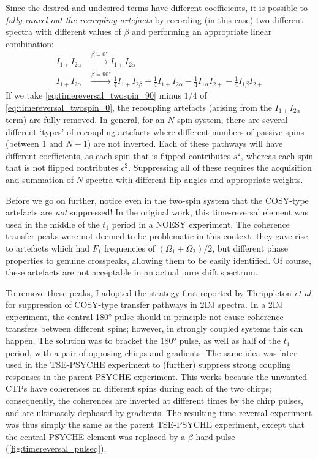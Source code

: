 Since the desired and undesired terms have different coefficients, it is possible to \textit{fully cancel out the recoupling artefacts} by recording (in this case) two different spectra with different values of $\beta$ and performing an appropriate linear combination:
\begin{align}
    I_{1+}I_{2\alpha} &\xrightarrow{\beta = \ang{0}} I_{1+}I_{2\alpha} \label{eq:timereversal_twospin_0} \\
    I_{1+}I_{2\alpha} &\xrightarrow{\beta = \ang{90}} \frac{1}{4}I_{1+}I_{2\beta} + \frac{1}{4}I_{1+}I_{2\alpha} - \frac{1}{4}I_{1\alpha}I_{2+} + \frac{1}{4}I_{1\beta}I_{2+} \label{eq:timereversal_twospin_90}
\end{align}
If we take \cref{eq:timereversal_twospin_90} minus $1/4$ of \cref{eq:timereversal_twospin_0}, the recoupling artefacts (arising from the $I_{1+}I_{2\alpha}$ term) are fully removed.
In general, for an $N$-spin system, there are several different `types' of recoupling artefacts where different numbers of passive spins (between 1 and $N - 1$) are not inverted.
Each of these pathways will have different coefficients, as each spin that is flipped contributes $s^2$, whereas each spin that is not flipped contributes $c^2$.
Suppressing all of these requires the acquisition and summation of $N$ spectra with different flip angles and appropriate weights.

Before we go on further, notice even in the two-spin system that the COSY-type artefacts are \textit{not} suppressed!
In the original work\autocite{Sorensen1985JACS}, this time-reversal element was used in the middle of the $t_1$ period in a NOESY experiment.
The coherence transfer peaks were not deemed to be problematic in this context: they gave rise to artefacts which had $F_1$ frequencies of $(\Omega_1 + \Omega_2)/2$, but different phase properties to genuine crosspeaks, allowing them to be easily identified.
Of course, these artefacts are not acceptable in an actual pure shift spectrum.

To remove these peaks, I adopted the strategy first reported by Thrippleton \textit{et al.} for suppression of COSY-type transfer pathways in 2DJ spectra.\autocite{Thrippleton2005JMR}
In a 2DJ experiment, the central \ang{180} pulse should in principle not cause coherence transfers between different spins; however, in strongly coupled systems this can happen.
The solution was to bracket the \ang{180} pulse, as well as half of the $t_1$ period, with a pair of opposing chirps and gradients.
The same idea was later used in the TSE-PSYCHE experiment\autocite{Foroozandeh2015CC} to (further) suppress strong coupling responses in the parent PSYCHE experiment.
This works because the unwanted CTPs have coherences on different spins during each of the two chirps; consequently, the coherences are inverted at different times by the chirp pulses, and are ultimately dephased by gradients.
The resulting time-reversal experiment was thus simply the same as the parent TSE-PSYCHE experiment, except that the central PSYCHE element was replaced by a $\beta$ hard pulse (\cref{fig:timereversal_pulseq}).

